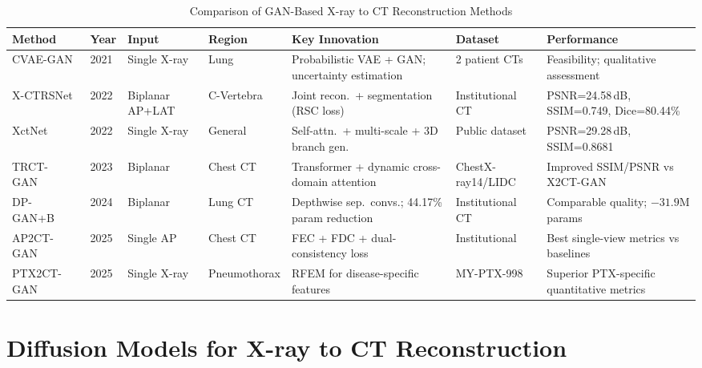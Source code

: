 \documentclass[10pt,twocolumn,a4paper]{article}
\begin{document}
\begin{table}[t]
\caption{Comparison of GAN-Based X-ray to CT Reconstruction Methods}
\label{tab:gan_comparison}
\centering\small
\setlength{\tabcolsep}{4pt}
\begin{tabular}{@{}llllp{2.6cm}p{2.0cm}p{2.8cm}@{}}
\toprule
\textbf{Method} & \textbf{Year} & \textbf{Input} & \textbf{Region} &
\textbf{Key Innovation} & \textbf{Dataset} & \textbf{Performance}\\
\midrule
CVAE-GAN~\cite{cvaegan} & 2021 & Single X-ray & Lung &
  Probabilistic VAE + GAN; uncertainty estimation & 2 patient CTs &
  Feasibility; qualitative assessment\\
X-CTRSNet~\cite{xctrsnet} & 2022 & Biplanar AP+LAT & C-Vertebra &
  Joint recon.\ + segmentation (RSC loss) & Institutional CT &
  PSNR=24.58\,dB, SSIM=0.749, Dice=80.44\%\\
XctNet~\cite{xctnet} & 2022 & Single X-ray & General &
  Self-attn.\ + multi-scale + 3D branch gen. & Public dataset &
  PSNR=29.28\,dB, SSIM=0.8681\\
TRCT-GAN~\cite{trctgan} & 2023 & Biplanar & Chest CT &
  Transformer + dynamic cross-domain attention & ChestX-ray14/LIDC &
  Improved SSIM/PSNR vs X2CT-GAN\\
DP-GAN+B~\cite{dpganb} & 2024 & Biplanar & Lung CT &
  Depthwise sep.\ convs.; 44.17\% param reduction & Institutional CT &
  Comparable quality; $-31.9$M params\\
AP2CT-GAN~\cite{ap2ctgan} & 2025 & Single AP & Chest CT &
  FEC + FDC + dual-consistency loss & Institutional &
  Best single-view metrics vs baselines\\
PTX2CT-GAN~\cite{ptx2ctgan} & 2025 & Single X-ray & Pneumothorax &
  RFEM for disease-specific features & MY-PTX-998 &
  Superior PTX-specific quantitative metrics\\
\bottomrule
\end{tabular}
\end{table}

\section{Diffusion Models for X-ray to CT Reconstruction}
\label{sec:diffusion}
\end{document}
